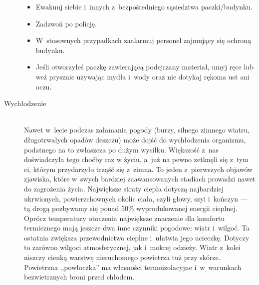 \documentclass[a5paper,10pt,titlepage,twoside]{article}
\begin{document}
\begin{description}
\begin{itemize}
\item Ewakuuj siebie i~innych z~bezpośredniego sąsiedztwa paczki/budynku.
\item Zadzwoń po policję.
\item W~stosownych przypadkach zaalarmuj personel zajmujący się ochroną budynku.
\item Jeśli otworzyłeś paczkę zawierającą podejrzany materiał, umyj ręce lub weź prysznic używając mydła i~wody oraz nie dotykaj rękoma ust ani oczu.
\end{itemize}
\item[Wychłodzenie] \hfill \\ Nawet w~lecie podczas załamania pogody (burzy, silnego zimnego wiatru, długotrwałych opadów deszczu) może dojść do wychłodzenia organizmu, podatnego na to zwłaszcza po dużym wysiłku. Większość z~nas doświadczyła tego choćby raz w życiu, a~już na pewno zetknęli się z~tym ci, którym przydarzyło trząść się z~zimna. To jeden z~pierwszych objawów zjawiska, które w~swych bardziej zaawansowanych stadiach prowadzi nawet do zagrożenia życia. Największe straty ciepła dotyczą najbardziej ukrwionych, powierzchownych okolic ciała, czyli głowy, szyi i~kończyn --- tą drogą pozbywamy się ponad 50\% wyprodukowanej energii cieplnej. Oprócz temperatury otoczenia największe znaczenie dla komfortu termicznego mają jeszcze dwa inne czynniki pogodowe: wiatr i~wilgoć. Ta ostatnia zwiększa przewodnictwo cieplne i~ułatwia jego ucieczkę. Dotyczy to zarówno wilgoci atmosferycznej, jak i~mokrej odzieży. Wiatr z~kolei niszczy cienką warstwę nieruchomego powietrza tuż przy skórze. Powietrzna ,,powłoczka'' ma własności termoizolacyjne i~w~warunkach bezwietrznych broni przed chłodem.


\end{description}
\end{document}
